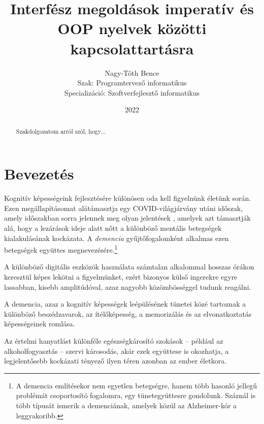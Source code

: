 \documentclass[tocnopagenum]{thesis-ekf}
\theoremstyle{definition}
\theoremstyle{remark}
\begin{document}
	\title{Interfész megoldások imperatív és OOP nyelvek közötti kapcsolattartásra}
	\author{Nagy-Tóth Bence\\Szak: Programtervező informatikus\\Specializáció: Szoftverfejlesztő informatikus}
	\date{2022}
	\maketitle
	\tableofcontents
	\begin{abstract}
		Szakdolgozatom arról szól, hogy...\lipsum[2]
	\end{abstract}
	\chapter*{Bevezetés}
	Kognitív képességeink fejlesztésére különösen oda kell figyelnünk életünk során. Ezen megállapításomat alátámasztja egy COVID-világjárvány utáni időszak, amely időszakban sorra jelennek meg olyan jelentések %
    \cite{brain1}, amelyek azt támasztják alá, hogy a lezárások ideje alatt nőtt a különböző mentális betegségek kialakulásának kockázata. A \textit{demencia} gyűjtőfogalomként alkalmas ezen betegségek együttes megnevezésére.\footnote{A demencia említésekor nem egyetlen betegségre, hanem több hasonló jellegű problémát  csoportosító fogalomra, egy tünetegyüttesre gondolunk. Száznál is több típusát ismerik a demenciának, amelyek közül az Alzheimer-kór a leggyakoribb.}
    
    A különböző digitális eszközök használata számtalan alkalommal hosszas órákon keresztül képes lekötni a figyelmünket, ezért bizonyos külső ingerekre egyre lassabban, kisebb amplitúdóval, azaz nagyobb közömbösséggel tudunk reagálni. 
    
    A demencia, azaz a kognitív képességek leépülésének tünetei közé tartoznak a különböző beszédzavarok, az ítélőképesség, a memorizálás és az elvonatkoztatás képességeinek romlása.
    
	\cite{dementia1}
	\cite{dementia2}
	\cite{dementia3}

	Az értelmi hanyatlást különféle egészségkárosító szokások -- például az alkoholfogyasztás -- szervi károsodás, akár ezek együttese is okozhatja, a legjelentősebb kockázati tényező ilyen téren azonban az ember életkora. 
	
\end{document}
